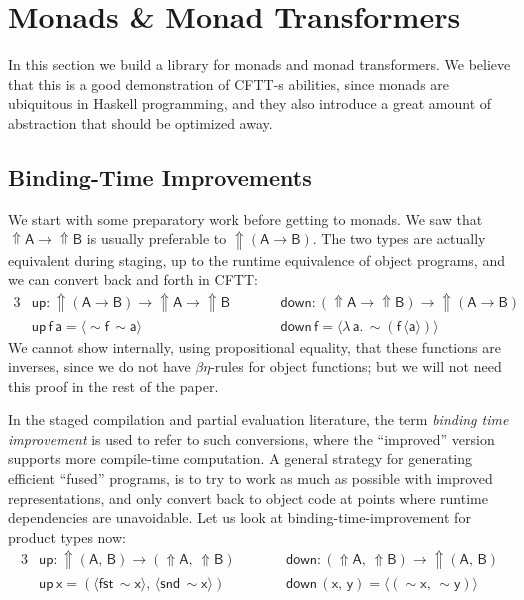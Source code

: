 \documentclass[acmsmall,screen,review,anonymous]{acmart}
\newcommand{\mit}[1]{{\mathsf{#1}}}
\newcommand{\msf}[1]{{\mathsf{#1}}}
\newcommand{\bs}[1]{\boldsymbol{#1}}
\newcommand{\ind}{\hspace{1em}}
\newcommand{\lam}{\lambda\,}
\newcommand{\vA}{\mathsf{A}}
\newcommand{\vB}{\mathsf{B}}
\newcommand{\va}{\mathsf{a}}
\newcommand{\vx}{\mathsf{x}}
\newcommand{\vy}{\mathsf{y}}
\newcommand{\vf}{\mathsf{f}}
\newcommand{\Up}{{\Uparrow}}
\newcommand{\spl}{{\bs{\sim}}}
\newcommand{\ql}{{\bs{\langle}}}
\newcommand{\qr}{{\bs{\rangle}}}
\newcommand{\fst}{\msf{fst}}
\newcommand{\snd}{\msf{snd}}
\theoremstyle{remark}
\newcommand{\mup}{\mit{up}}
\newcommand{\mdown}{\mit{down}}
\newcommand{\qt}[1]{\ql#1\qr}
\begin{document}
\section{Monads \& Monad Transformers}\label{sec:monad-transformers}

In this section we build a library for monads and monad transformers. We believe
that this is a good demonstration of CFTT-s abilities, since monads are
ubiquitous in Haskell programming, and they also introduce a great amount of
abstraction that should be optimized away.

\subsection{Binding-Time Improvements}\label{sec:binding-time-improvements}

We start with some preparatory work before getting to monads. We saw that $\Up
\vA \to \Up \vB$ is usually preferable to $\Up(\vA \to \vB)$. The two types are
actually equivalent during staging, up to the runtime equivalence of object programs,
and we can convert back and forth in CFTT:
\begin{alignat*}{3}
  &\mup : \Up (\vA \to \vB) \to \Up \vA \to \Up \vB && \ind\ind \mdown : (\Up \vA \to \Up \vB) \to \Up (\vA \to \vB) \\
  &\mup\,\vf\,\va = \ql \spl \vf\, \spl \va\qr   && \ind\ind \mdown\,\vf = \ql \lam \va.\,\spl(\vf\,\ql \va \qr) \qr
\end{alignat*}
We cannot show internally, using propositional equality, that these functions are
inverses, since we do not have $\beta\eta$-rules for object functions; but we
will not need this proof in the rest of the paper.

In the staged compilation and partial evaluation literature, the term
\emph{binding time improvement} is used to refer to such conversions, where
the ``improved'' version supports more compile-time computation. A general
strategy for generating efficient ``fused'' programs, is to try to work as much
as possible with improved representations, and only convert back to object code
at points where runtime dependencies are unavoidable. Let us look at
binding-time-improvement for product types now:
\begin{alignat*}{3}
  &\mup : \Up (\vA,\,\vB) \to (\Up \vA,\,\Up \vB) && \ind\ind \mdown : (\Up \vA,\,\Up \vB) \to \Up(\vA,\,\vB) \\
  &\mup\,\vx = (\qt{\fst\,\spl \vx},\, \qt{\snd\,\spl \vx})   && \ind\ind \mdown\,(\vx,\,\vy) = \qt{(\spl \vx,\,\spl \vy)}
\end{alignat*}
\end{document}
